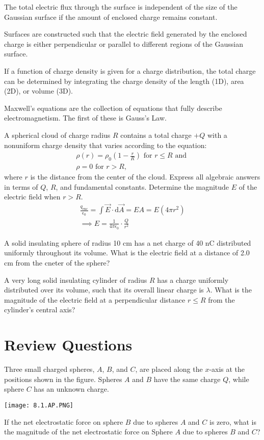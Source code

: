 \documentclass[../em.tex]{subfiles}
\begin{document}
The total electric flux through the surface is independent of the size of the Gaussian 
surface if the amount of enclosed charge remains constant.

Surfaces are constructed such that the electric field generated by the enclosed 
charge is either perpendicular or parallel to different regions of the Gaussian surface.

If a function of charge density is given for a charge distribution, the total 
charge can be determined by integrating the charge density of the length (1D), area (2D), or volume (3D).

Maxwell's equations are the collection of equations that fully describe electromagnetism. The first of these is Gauss's Law.

\pagebreak
\begin{example}
    A spherical cloud of charge radius $R$ contains a total charge $+Q$ with a 
    nonuniform charge density that varies according to the equation:
    \begin{align*}
        \rho(r)=\rho_0\left(1-\frac{r}{R}\right) \text{ for } r\leq R \text{ and }\\
        \rho = 0 \text{ for } r>R\text{,}
    \end{align*}
    where $r$ is the distance from the center of the cloud. Express all algebraic answers in terms of $Q$, $R$, and fundamental constants. Determine the magnitude $E$ of the electric field when $r>R$.
    \begin{align*}
        \frac{q_\text{enc}}{\epsilon_0}=\int\vec{E}\cdot\mathrm{d}\vec{A}=EA=E(4\pi r^2)
        \\
        \implies E=\frac{1}{4\pi\epsilon_0}\cdot\frac{Q}{r^2}
    \end{align*}
\end{example}
\ex A solid insulating sphere of radius 10 cm has a net charge of 40 nC distributed uniformly throughout its volume. What is the electric field at a distance of 2.0 cm from the cneter of the sphere?

\ex A very long solid insulating cylinder of radius $R$ has a charge uniformly distributed over its volume, such that its overall linear charge is $\lambda$. What is the magnitude of the electric field at a perpendicular distance $r\leq R$ from the cylinder's central axis?

\section*{Review Questions}
\ex Three small charged spheres, $A$, $B$, and $C$, are placed along the $x$-axis at the positions shown in the figure. Spheres $A$ and $B$ have the same charge $Q$, while sphere $C$ has an unknown charge. 
\begin{center}
    \texttt{[image: 8.1.AP.PNG]}
\end{center}
If the net electrostatic force on sphere $B$ due to spheres $A$ and $C$ is zero, what is the magnitude of the net electrostatic force on Sphere $A$ due to spheres $B$ and $C$?
\end{document}
